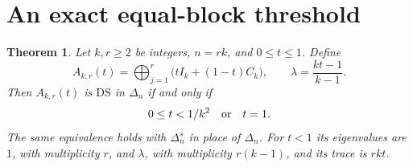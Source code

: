 \documentclass[11pt]{article}
\newtheorem{theorem}{Theorem}
\newcommand{\DS}{\mathrm{DS}}
\newcommand{\Del}{\Delta}
\begin{document}
\section{An exact equal-block threshold}
\begin{theorem}\label{thm:threshold}
Let $k,r\geq2$ be integers, $n=rk$, and $0\leq t\leq1$. Define
\begin{equation}\label{eq:family}
 A_{k,r}(t)=\bigoplus_{j=1}^r\bigl(tI_k+(1-t)C_k\bigr),
 \qquad \lambda=\frac{kt-1}{k-1}.
\end{equation}
Then $A_{k,r}(t)$ is $\DS$ in $\Del_n$ if and only if
\begin{equation}\label{eq:threshold}
 0\leq t<1/k^2\quad\hbox{or}\quad t=1.
\end{equation}
The same equivalence holds with $\Del_n^s$ in place of $\Del_n$.
For $t<1$ its eigenvalues are $1$, with multiplicity $r$, and $\lambda$, with multiplicity $r(k-1)$, and its trace is $rkt$.
\end{theorem}
\end{document}
